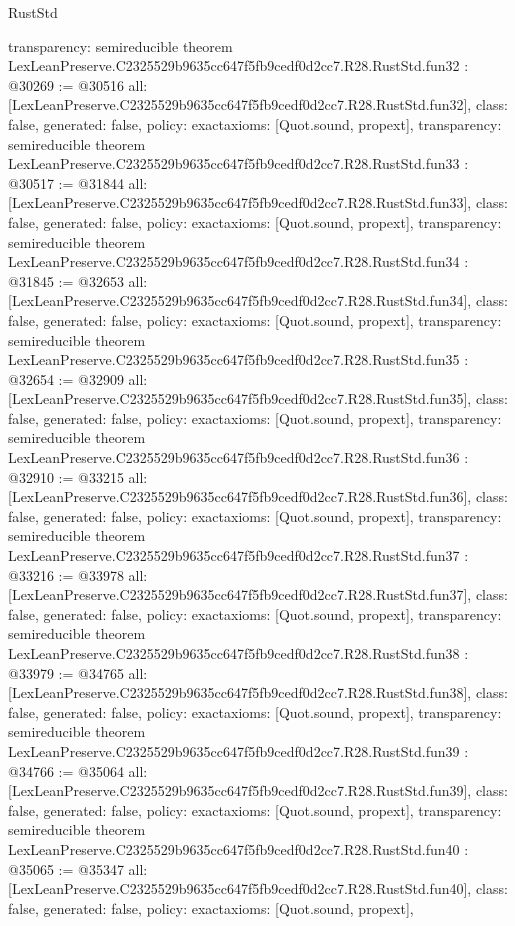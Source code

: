 \begin{lexlean}{RustStd}
\begin{coremodule}
{  transparency: semireducible
}
theorem LexLeanPreserve.C2325529b9635cc647f5fb9cedf0d2cc7.R28.RustStd.fun32 : @30269 := @30516 {
  all: [LexLeanPreserve.C2325529b9635cc647f5fb9cedf0d2cc7.R28.RustStd.fun32],
  class: false,
  generated: false,
  policy: exact{axioms: [Quot.sound, propext]},
  transparency: semireducible
}
theorem LexLeanPreserve.C2325529b9635cc647f5fb9cedf0d2cc7.R28.RustStd.fun33 : @30517 := @31844 {
  all: [LexLeanPreserve.C2325529b9635cc647f5fb9cedf0d2cc7.R28.RustStd.fun33],
  class: false,
  generated: false,
  policy: exact{axioms: [Quot.sound, propext]},
  transparency: semireducible
}
theorem LexLeanPreserve.C2325529b9635cc647f5fb9cedf0d2cc7.R28.RustStd.fun34 : @31845 := @32653 {
  all: [LexLeanPreserve.C2325529b9635cc647f5fb9cedf0d2cc7.R28.RustStd.fun34],
  class: false,
  generated: false,
  policy: exact{axioms: [Quot.sound, propext]},
  transparency: semireducible
}
theorem LexLeanPreserve.C2325529b9635cc647f5fb9cedf0d2cc7.R28.RustStd.fun35 : @32654 := @32909 {
  all: [LexLeanPreserve.C2325529b9635cc647f5fb9cedf0d2cc7.R28.RustStd.fun35],
  class: false,
  generated: false,
  policy: exact{axioms: [Quot.sound, propext]},
  transparency: semireducible
}
theorem LexLeanPreserve.C2325529b9635cc647f5fb9cedf0d2cc7.R28.RustStd.fun36 : @32910 := @33215 {
  all: [LexLeanPreserve.C2325529b9635cc647f5fb9cedf0d2cc7.R28.RustStd.fun36],
  class: false,
  generated: false,
  policy: exact{axioms: [Quot.sound, propext]},
  transparency: semireducible
}
theorem LexLeanPreserve.C2325529b9635cc647f5fb9cedf0d2cc7.R28.RustStd.fun37 : @33216 := @33978 {
  all: [LexLeanPreserve.C2325529b9635cc647f5fb9cedf0d2cc7.R28.RustStd.fun37],
  class: false,
  generated: false,
  policy: exact{axioms: [Quot.sound, propext]},
  transparency: semireducible
}
theorem LexLeanPreserve.C2325529b9635cc647f5fb9cedf0d2cc7.R28.RustStd.fun38 : @33979 := @34765 {
  all: [LexLeanPreserve.C2325529b9635cc647f5fb9cedf0d2cc7.R28.RustStd.fun38],
  class: false,
  generated: false,
  policy: exact{axioms: [Quot.sound, propext]},
  transparency: semireducible
}
theorem LexLeanPreserve.C2325529b9635cc647f5fb9cedf0d2cc7.R28.RustStd.fun39 : @34766 := @35064 {
  all: [LexLeanPreserve.C2325529b9635cc647f5fb9cedf0d2cc7.R28.RustStd.fun39],
  class: false,
  generated: false,
  policy: exact{axioms: [Quot.sound, propext]},
  transparency: semireducible
}
theorem LexLeanPreserve.C2325529b9635cc647f5fb9cedf0d2cc7.R28.RustStd.fun40 : @35065 := @35347 {
  all: [LexLeanPreserve.C2325529b9635cc647f5fb9cedf0d2cc7.R28.RustStd.fun40],
  class: false,
  generated: false,
  policy: exact{axioms: [Quot.sound, propext]},
}
\end{coremodule}
\end{lexlean}
